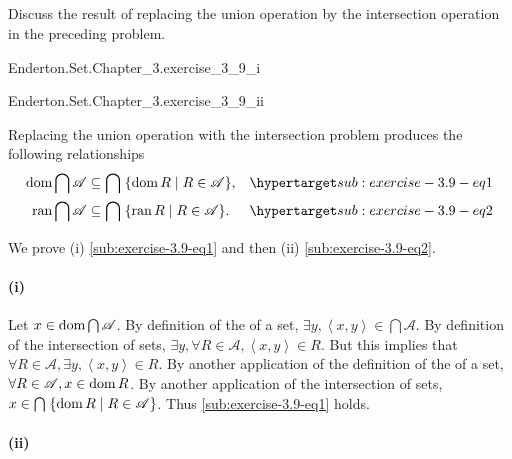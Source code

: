 \documentclass{report}
\newcommand{\pair}[1]{\left< #1 \right>}
\begin{document}
\subsection{}%

Discuss the result of replacing the union operation by the intersection
  operation in the preceding problem.

\begin{answer}

  \statementpadding

    {Enderton.Set.Chapter\_3.exercise\_3\_9\_i}

    {Enderton.Set.Chapter\_3.exercise\_3\_9\_ii}

  Replacing the union operation with the intersection problem produces the
    following relationships
    \begin{align}
      \dom{\bigcap{\mathscr{A}}}
        & \subseteq \bigcap\;\{ \dom{R} \mid R \in \mathscr{A} \},
        & \hyperlabel{sub:exercise-3.9-eq1} \\
      \ran{\bigcap{\mathscr{A}}}
        & \subseteq \bigcap\;\{ \ran{R} \mid R \in \mathscr{A} \}.
        & \hyperlabel{sub:exercise-3.9-eq2}
    \end{align}

  We prove (i) \eqref{sub:exercise-3.9-eq1} and then (ii)
    \eqref{sub:exercise-3.9-eq2}.

  \paragraph{(i)}%

    Let $x \in \mathop{\text{dom}}{\bigcap{\mathscr{A}}}$.
    By definition of the  of a set,
      $\exists y, \pair{x, y} \in \bigcap{\mathscr{A}}$.
    By definition of the intersection of sets,
      $\exists y, \forall R \in \mathscr{A}, \pair{x, y} \in R$.
    But this implies that
      $\forall R \in \mathscr{A}, \exists y, \pair{x, y} \in R$.
    By another application of the definition of the  of a
      set, $\forall R \in \mathscr{A}, x \in \mathop{\text{dom}}{R}$.
    By another application of the intersection of sets,
      $x \in \bigcap\;\{ \mathop{\text{dom}}{R} \mid R \in \mathscr{A} \}$.
      Thus \eqref{sub:exercise-3.9-eq1} holds.

  \paragraph{(ii)}%


\end{answer}
\end{document}
